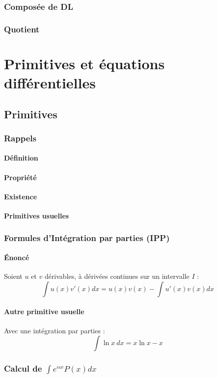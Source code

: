 \documentclass[12pt,a4paper,french]{book}
\begin{document}
		\subsection{Composée de DL}
		\subsection{Quotient}
		
\chapter{Primitives et équations différentielles}
	\section{Primitives}
		\subsection{Rappels}
			\subsubsection{Définition}
			\subsubsection{Propriété}
			\subsubsection{Existence}
			\subsubsection{Primitives usuelles}
		\subsection{Formules d'Intégration par parties (IPP)}
			\subsubsection{Énoncé}
			Soient $u$ et $v$ dérivables, à dérivées continues sur un intervalle $I$ :
			\[\int u(x) v'(x) dx = u(x)v(x) - \int u'(x)v(x)dx\]
			\subsubsection{Autre primitive usuelle}
			Avec une intégration par parties :
			\[\int \ln x \ dx = x\ln x - x \]
		\subsection{Calcul de $\int e^{\alpha x}P(x)dx$}
\end{document}
